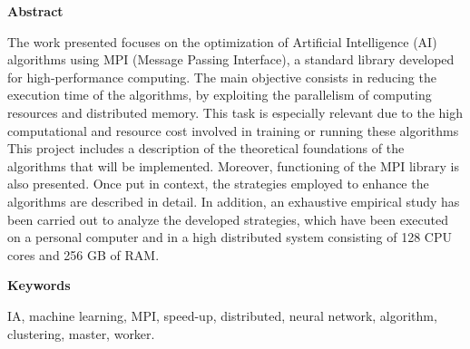 
\newpage

\thispagestyle{empty}

\begin{center}

{\bf \Huge Abstract}

  \end{center}
\vspace{1cm}

The work presented focuses on the optimization of Artificial Intelligence (AI) algorithms using MPI (Message Passing Interface), a standard library developed for high-performance computing.
The main objective consists in reducing the execution time of the algorithms, by exploiting the parallelism of computing resources and distributed memory. This task is especially relevant due to the high computational and resource cost involved in training or running these algorithms
This project includes a description of the theoretical foundations of the algorithms that will be implemented. Moreover, functioning of the MPI library is also presented.
Once put in context, the strategies employed to enhance the algorithms are described in detail.
In addition, an exhaustive empirical study has been carried out to analyze the developed strategies, which have been executed on a personal computer and in a high distributed system consisting of 128 CPU cores and 256 GB of RAM.


\vspace{1cm}


\begin{center}

{\bf \Large Keywords}

   \end{center}

   \vspace{0.5cm}
   
IA, machine learning, MPI, speed-up, distributed, neural network, algorithm, clustering, master, worker.
   


